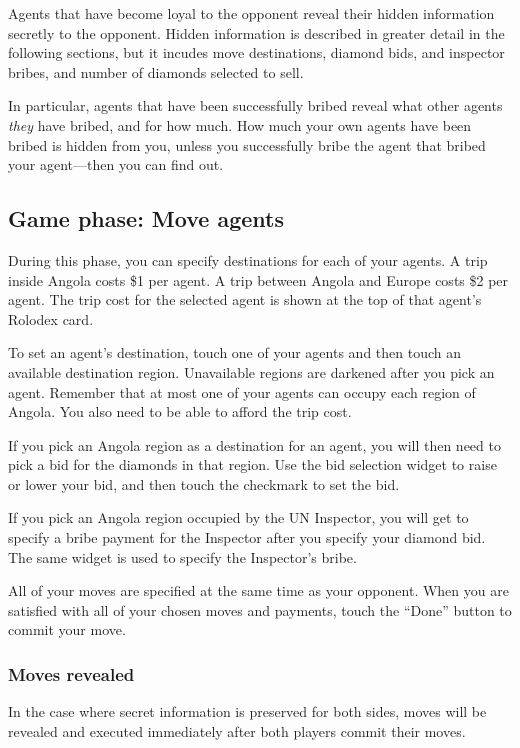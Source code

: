 \documentclass[8pt]{extbook}
\begin{document}
Agents that have become loyal to the opponent reveal their hidden information secretly to the opponent.  Hidden information is described in greater detail in the following sections, but it incudes move destinations, diamond bids, and inspector bribes, and number of diamonds selected to sell.

In particular, agents that have been successfully bribed reveal what other agents {\it they} have bribed, and for how much.  How much your own agents have been bribed is hidden from you, unless you successfully bribe the agent that bribed your agent---then you can find out.

\subsection{Game phase:  Move agents}

During this phase, you can specify destinations for each of your agents.  A trip inside Angola costs \$1 per agent.  A trip between Angola and Europe costs \$2 per agent.  The trip cost for the selected agent is shown at the top of that agent's Rolodex card.

To set an agent's destination, touch one of your agents and then touch an available destination region.  Unavailable regions are darkened after you pick an agent.  Remember that at most one of your agents can occupy each region of Angola.  You also need to be able to afford the trip cost.

If you pick an Angola region as a destination for an agent, you will then need to pick a bid for the diamonds in that region.  Use the bid selection widget to raise or lower your bid, and then touch the checkmark to set the bid.

If you pick an Angola region occupied by the UN Inspector, you will get to specify a bribe payment for the Inspector after you specify your diamond bid.  The same widget is used to specify the Inspector's bribe.

All of your moves are specified at the same time as your opponent.  When you are satisfied with all of your chosen moves and payments, touch the ``Done'' button to commit your move.

\subsubsection{Moves revealed}
In the case where secret information is preserved for both sides, moves will be revealed and executed immediately after both players commit their moves.
\end{document}
